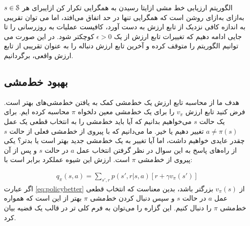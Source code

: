 {الگوریتم ارزیابی خط مشی}
‌ازای{تا رسیدن به همگرایی تکرار کن}
‌ازای{برای هر $s \in \EuScript{S}$}
‌به‌ازای
‌به‌ازای
روشن است که همگرایی تنها در حد اتفاق می‌افتد، اما می توان تقریبی به اندازه کافی نزدیک از تابع ارزش به دست آورد، کافیست عملیات به روزرسانی را تا جایی ادامه دهیم که تغییرات تابع ارزش از یک
$\epsilon > 0$
کوچکتر شود. در این صورت می توانیم الگوریتم را متوقف کرده و آخرین تابع ارزش دنباله را به عنوان تقریبی از تابع ارزش واقعی، برگردانیم.

% 
%

\subsection{بهبود خط‌مشی}

هدف ما از محاسبه تابع ارزش یک خط‌مشی کمک به یافتن خط‌مشی‌های بهتر است.
فرض کنید تابع ارزش 
$v_{\pi}$
 را برای یک خط‌مشی معین  دلخواه 
 $\pi$
  محاسبه کرده ایم. برای یک حالت 
  $s$
 می‌خواهیم بدانیم که آیا باید خط‌مشی را به انتخاب قطعی یک عمل 
 $a \neq \pi(s)$
  تغییر دهیم یا خیر.
ما می‌دانیم که با پیروی از خط‌مشی فعلی از حالت
 $s$
  چقدر عایدی خواهیم داشت، اما آیا تغییر به یک خط‌مشی جدید بهتر است یا بدتر؟
  یکی از راه‌های پاسخ به این سوال در نظر گرفتن انتخاب عمل  
  $a$
در حالت 
$s$
و پس از آن پیروی از خط‌مشی
$\pi$
 است. 
 ارزش این شیوه عملکرد برابر است با:
 
 \begin{align}
q_\pi(s,a) = \sum_{s',r} p(s',r|s,a)\left[r + \gamma v_\pi(s')\right]	
 	\label{eq:policybetter}
 \end{align}
 اگر عبارت 
 \ref{eq:policybetter}
 از $v_\pi(s)$ بزرگتر باشد، بدین معناست که انتخاب قطعی عمل $a$ در حالت $s$ و سپس دنبال کردن خط‌مشی $\pi$ بهتر از این است که همواره خط‌مشی $\pi$ را دنبال کنیم. این گزاره را می‌توان به فرم کلی تر در قالب یک قضیه بیان کرد.

